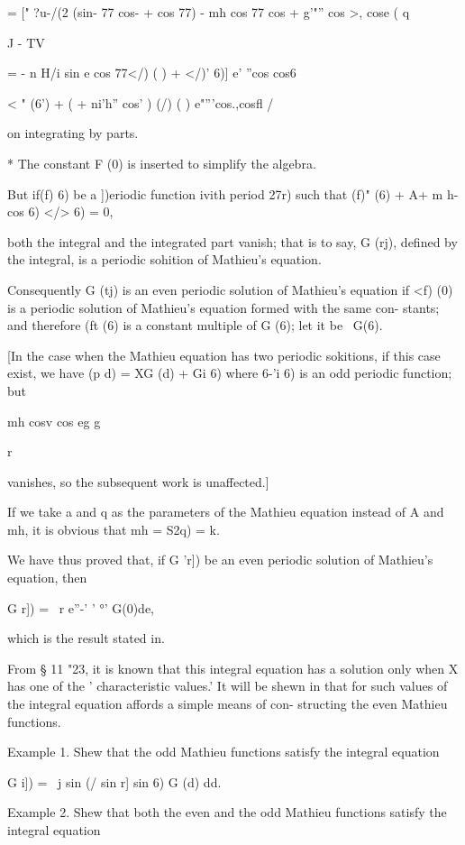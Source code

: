 = [" ?u-/(2 (sin- 77 cos- + cos 77) - mh cos 77 cos + g'"'' cos >,
cose ( q

J - TV

= - n H/i sin e cos 77</) ( ) + </)' 6)] e' ''cos cos6

 < " (6') + ( + ni'h'' cos' ) (/) ( ) e"'''cos.,cosfl /

on integrating by parts.

* The constant F (0) is inserted to simplify the algebra.

%
%

But if(f) 6) be a ])eriodic function ivith period 27r) such that (f)"
(6) + A+ m h- cos 6) </> 6) = 0,

both the integral and the integrated part vanish; that is to say, G
(rj), defined by the integral, is a periodic sohition of Mathieu's
equation.

Consequently G (tj) is an even periodic solution of Mathieu's equation
if <f) (0) is a periodic solution of Mathieu's equation formed with
the same con- stants; and therefore (ft (6) is a constant multiple of
G (6); let it be \ G(6).

[In the case when the Mathieu equation has two periodic sokitions, if
this case exist, we have (p d) = XG (d) + Gi 6) where 6-'i 6) is an
odd periodic function; but

 mh cosv cos eg g

r

vanishes, so the subsequent work is unaffected.]

If we take a and q as the parameters of the Mathieu equation instead
of A and mh, it is obvious that mh = \/ S2q) = k.

We have thus proved that, if G 'r]) be an even periodic solution of
Mathieu's equation, then

G r]) = \ r e''-' ' °' G(0)de,

which is the result stated in.

From § 11 "23, it is known that this integral equation has a solution
only when X has one of the ' characteristic values.' It will be shewn
in that for such values of \, the integral equation affords a
simple means of con- structing the even Mathieu functions.

Example 1. Shew that the odd Mathieu functions satisfy the integral
equation

G i]) = \ j sin (/ sin r] sin 6) G (d) dd.

Example 2. Shew that both the even and the odd Mathieu functions
satisfy the integral equation

